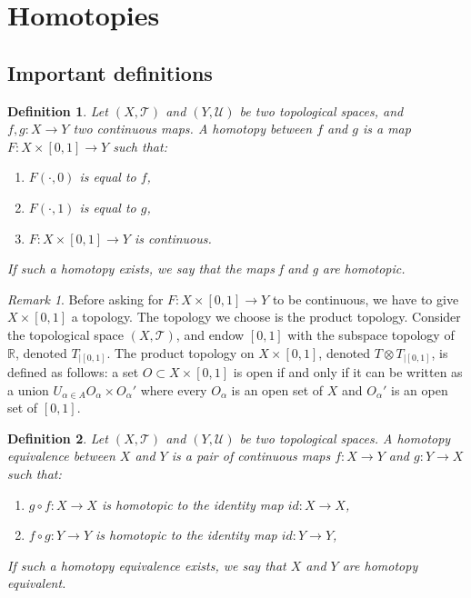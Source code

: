 \documentclass[a4paper,11pt]{article}
\theoremstyle{mytheor}
\newtheorem{definition}{Definition}[subsection]
\theoremstyle{mytheor}
\theoremstyle{remark}
\newtheorem*{remark}{Remark}
\newcommand{\T}{\mathcal{T}}
\newcommand{\U}{\mathcal{U}}
\newcommand{\R}{\mathbb{R}}
\begin{document}
\newpage

\section{Homotopies}

\subsection{Important definitions}

\begin{definition}
    Let $(X, \T)$ and $(Y, \U)$ be two topological spaces, and $f, g : X \to Y$
    two continuous maps. A homotopy between $f$ and $g$ is a map $F : X \times
    [0, 1] \to Y$ such that:
    \begin{enumerate}
        \item $F(\cdot, 0)$ is equal to $f$, 
        \item $F(\cdot, 1)$ is equal to $g$, 
        \item $F : X \times [0, 1] \to Y$ is continuous.
    \end{enumerate}
    If such a homotopy exists, we say that the maps f and g are homotopic.
\end{definition}

\begin{remark}
    Before asking for $F : X \times [0, 1] \to Y$ to be continuous, we have to
    give $X \times [0, 1]$ a topology. The topology we choose is the product
    topology. Consider the topological space $(X, \T)$, and endow $[0, 1]$
    with the subspace topology of $\R$, denoted $T_{|[0,1]}$. The product
    topology on $X \times [0, 1]$, denoted $T \otimes T_{|[0,1]}$, is defined
    as follows: a set $O \subset X \times [0, 1]$ is open if and only if it
    can be written as a union $U_{\alpha \in A} O_{\alpha} \times O_{\alpha}'$
    where every $O_{\alpha}$ is an open set of $X$ and $O_{\alpha}'$ is an open set of $[0, 1]$.
\end{remark}
 
\begin{definition}
    Let $(X, \T)$ and $(Y, \U)$ be two topological spaces. A homotopy
    equivalence between $X$ and $Y$ is a pair of continuous maps $f : X \to Y$
    and $g : Y \to X$ such that:
    \begin{enumerate}
        \item $g \circ f : X \to X$ is homotopic to the identity map $id: X \to X$,
        \item $f \circ g : Y \to Y$ is homotopic to the identity map $id: Y \to Y$,
    \end{enumerate}
    If such a homotopy equivalence exists, we say that $X$ and $Y$ are homotopy equivalent.   
\end{definition}
\end{document}
